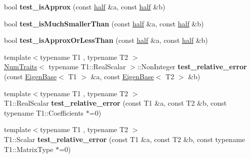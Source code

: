 \begin{DoxyCompactItemize}
\item 
\mbox{\label{namespace_eigen_ab07a6e30e32d873d4d4407af7f8f1c85}} 
bool {\bfseries test\+\_\+is\+Approx} (const \hyperlink{struct_eigen_1_1half}{half} \&a, const \hyperlink{struct_eigen_1_1half}{half} \&b)
\item 
\mbox{\label{namespace_eigen_aa557ca2c46c6c84ef2881c337db44e6f}} 
bool {\bfseries test\+\_\+is\+Much\+Smaller\+Than} (const \hyperlink{struct_eigen_1_1half}{half} \&a, const \hyperlink{struct_eigen_1_1half}{half} \&b)
\item 
\mbox{\label{namespace_eigen_ab0fd2bcbfdf7631c2126988baef5ca9d}} 
bool {\bfseries test\+\_\+is\+Approx\+Or\+Less\+Than} (const \hyperlink{struct_eigen_1_1half}{half} \&a, const \hyperlink{struct_eigen_1_1half}{half} \&b)
\item 
\mbox{\label{namespace_eigen_a420a78795b09cd2a7cc1a5bc4e3f30b7}} 
{\footnotesize template$<$typename T1 , typename T2 $>$ }\\\hyperlink{group___core___module_struct_eigen_1_1_num_traits}{Num\+Traits}$<$ typename T1\+::\+Real\+Scalar $>$\+::Non\+Integer {\bfseries test\+\_\+relative\+\_\+error} (const \hyperlink{group___core___module_struct_eigen_1_1_eigen_base}{Eigen\+Base}$<$ T1 $>$ \&a, const \hyperlink{group___core___module_struct_eigen_1_1_eigen_base}{Eigen\+Base}$<$ T2 $>$ \&b)
\item 
\mbox{\label{namespace_eigen_a5b6c439203185801630c2857b44ef276}} 
{\footnotesize template$<$typename T1 , typename T2 $>$ }\\T1\+::\+Real\+Scalar {\bfseries test\+\_\+relative\+\_\+error} (const T1 \&a, const T2 \&b, const typename T1\+::\+Coefficients $\ast$=0)
\item 
\mbox{\label{namespace_eigen_a6d9a46db32498d15a7ea8d09574bbf39}} 
{\footnotesize template$<$typename T1 , typename T2 $>$ }\\T1\+::\+Scalar {\bfseries test\+\_\+relative\+\_\+error} (const T1 \&a, const T2 \&b, const typename T1\+::\+Matrix\+Type $\ast$=0)
\item 
\mbox{\label{namespace_eigen_ac2f0a7266e0f6a0079eb31cfcf06afcc}} 

\end{DoxyCompactItemize}
